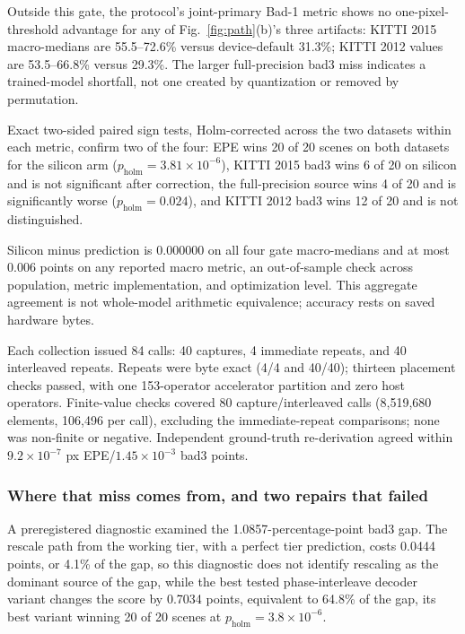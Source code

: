\documentclass[sigconf,review,anonymous]{acmart}
\begin{document}
Outside this gate, the protocol's joint-primary Bad-1 metric shows no one-pixel-threshold advantage for any of Fig.~\ref{fig:path}(b)'s three artifacts: KITTI 2015 macro-medians are 55.5--72.6\% versus device-default 31.3\%; KITTI 2012 values are 53.5--66.8\% versus 29.3\%. The larger full-precision bad3 miss indicates a trained-model shortfall, not one created by quantization or removed by permutation.

Exact two-sided paired sign tests, Holm-corrected across the two datasets within each metric, confirm two of the four: EPE wins 20 of 20 scenes on both datasets for the silicon arm ($p_{\mathrm{holm}} = 3.81\times10^{-6}$), KITTI 2015 bad3 wins 6 of 20 on silicon and is not significant after correction, the full-precision source wins 4 of 20 and is significantly worse ($p_{\mathrm{holm}} = 0.024$), and KITTI 2012 bad3 wins 12 of 20 and is not distinguished.

Silicon minus prediction is $0.000000$ on all four gate macro-medians and at most 0.006 points on any reported macro metric, an out-of-sample check across population, metric implementation, and optimization level. This aggregate agreement is not whole-model arithmetic equivalence; accuracy rests on saved hardware bytes.

Each collection issued 84 calls: 40 captures, 4 immediate repeats, and 40 interleaved repeats. Repeats were byte exact (4/4 and 40/40); thirteen placement checks passed, with one 153-operator accelerator partition and zero host operators. Finite-value checks covered 80 capture/interleaved calls (8,519,680 elements, 106,496 per call), excluding the immediate-repeat comparisons; none was non-finite or negative. Independent ground-truth re-derivation agreed within $9.2\times10^{-7}$ px EPE/$1.45\times10^{-3}$ bad3 points.

\subsubsection{Where that miss comes from, and two repairs that failed}
\label{sec:e2diag}
A preregistered diagnostic examined the 1.0857-percentage-point bad3 gap. The rescale path from the working tier, with a perfect tier prediction, costs 0.0444 points, or 4.1\% of the gap, so this diagnostic does not identify rescaling as the dominant source of the gap, while the best tested phase-interleave decoder variant changes the score by 0.7034 points, equivalent to 64.8\% of the gap, its best variant winning 20 of 20 scenes at $p_{\mathrm{holm}} = 3.8\times10^{-6}$.
\end{document}
